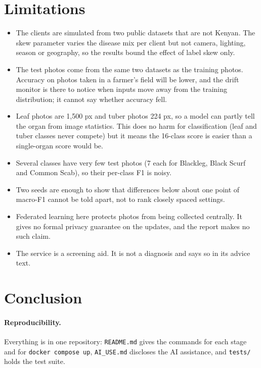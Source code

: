 \documentclass[11pt,a4paper]{article}
\begin{document}
\begin{table}[H]\centering\small

\caption{Per-class results of the shipped model on the test set.}\label{tab:perclass}
\end{table}

\RESULTCLASS

\section{Limitations}
\begin{itemize}[noitemsep]
\item The clients are simulated from two public datasets that are not Kenyan. The skew parameter varies the disease mix per client but not camera, lighting, season or geography, so the results bound the effect of label skew only.
\item The test photos come from the same two datasets as the training photos. Accuracy on photos taken in a farmer's field will be lower, and the drift monitor is there to notice when inputs move away from the training distribution; it cannot say whether accuracy fell.
\item Leaf photos are 1,500 px and tuber photos 224 px, so a model can partly tell the organ from image statistics. This does no harm for classification (leaf and tuber classes never compete) but it means the 16-class score is easier than a single-organ score would be.
\item Several classes have very few test photos (7 each for Blackleg, Black Scurf and Common Scab), so their per-class F1 is noisy.
\item Two seeds are enough to show that differences below about one point of macro-F1 cannot be told apart, not to rank closely spaced settings.
\item Federated learning here protects photos from being collected centrally. It gives no formal privacy guarantee on the updates, and the report makes no such claim.
\item The service is a screening aid. It is not a diagnosis and says so in its advice text.
\end{itemize}

\section{Conclusion}
\CONCLUSION

\paragraph{Reproducibility.} Everything is in one repository: \texttt{README.md} gives the commands for each stage and for \texttt{docker compose up}, \texttt{AI\_USE.md} discloses the AI assistance, and \texttt{tests/} holds the test suite.



\end{document}
